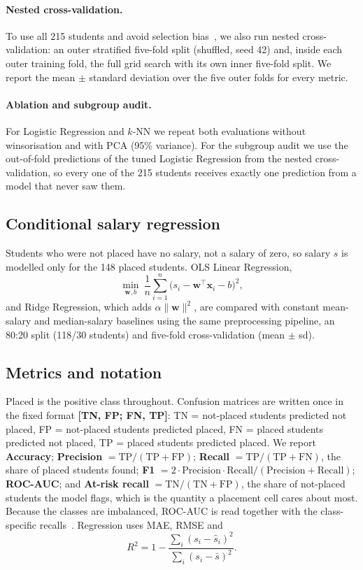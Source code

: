 \documentclass[runningheads]{llncs}
\begin{document}
\paragraph{Nested cross-validation.} To use all 215 students and avoid selection bias~\cite{varma,cawley}, we also run nested cross-validation: an outer stratified five-fold split (shuffled, seed 42) and, inside each outer training fold, the full grid search with its own inner five-fold split. We report the mean $\pm$ standard deviation over the five outer folds for every metric.

\paragraph{Ablation and subgroup audit.} For Logistic Regression and $k$-NN we repeat both evaluations without winsorisation and with PCA (95\% variance). For the subgroup audit we use the out-of-fold predictions of the tuned Logistic Regression from the nested cross-validation, so every one of the 215 students receives exactly one prediction from a model that never saw them.

\subsection{Conditional salary regression}
Students who were not placed have no salary, not a salary of zero, so salary $s$ is modelled only for the 148 placed students. OLS Linear Regression,
\begin{equation}
\min_{\mathbf{w},b}\ \frac{1}{n}\sum_{i=1}^{n}\big(s_i-\mathbf{w}^{\top}\mathbf{x}_i-b\big)^2 ,
\end{equation}
and Ridge Regression, which adds $\alpha\lVert\mathbf{w}\rVert^2$, are compared with constant mean-salary and median-salary baselines using the same preprocessing pipeline, an 80:20 split (118/30 students) and five-fold cross-validation (mean $\pm$ sd).

\subsection{Metrics and notation}
Placed is the positive class throughout. Confusion matrices are written once in the fixed format \textbf{[TN, FP; FN, TP]}: TN = not-placed students predicted not placed, FP = not-placed students predicted placed, FN = placed students predicted not placed, TP = placed students predicted placed. We report \textbf{Accuracy}; \textbf{Precision} $=\mathrm{TP}/(\mathrm{TP}+\mathrm{FP})$; \textbf{Recall} $=\mathrm{TP}/(\mathrm{TP}+\mathrm{FN})$, the share of placed students found; \textbf{F1} $=2\cdot\text{Precision}\cdot\text{Recall}/(\text{Precision}+\text{Recall})$; \textbf{ROC-AUC}; and \textbf{At-risk recall} $=\mathrm{TN}/(\mathrm{TN}+\mathrm{FP})$, the share of not-placed students the model flags, which is the quantity a placement cell cares about most. Because the classes are imbalanced, ROC-AUC is read together with the class-specific recalls~\cite{saito}. Regression uses MAE, RMSE and
\begin{equation}
R^2 = 1-\frac{\sum_i (s_i-\hat{s}_i)^2}{\sum_i (s_i-\bar{s})^2}.
\end{equation}
\end{document}
